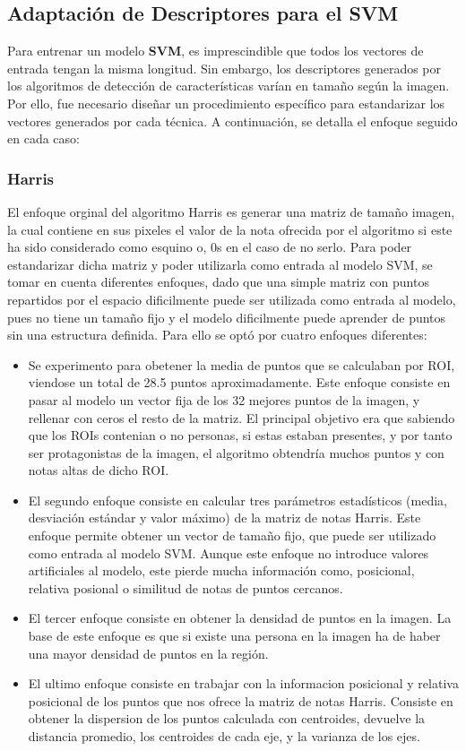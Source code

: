 \documentclass[a4paper]{article}
\begin{document}
\subsection{Adaptación de Descriptores para el SVM}

Para entrenar un modelo \textbf{SVM}, es imprescindible que todos los vectores de entrada tengan la misma longitud. Sin embargo, los descriptores generados por los algoritmos de detección de características varían en tamaño según la imagen. Por ello, fue necesario diseñar un procedimiento específico para estandarizar los vectores generados por cada técnica. A continuación, se detalla el enfoque seguido en cada caso:

\subsubsection*{Harris}

El enfoque orginal del algoritmo Harris es generar una matriz de tamaño imagen, la cual contiene en sus pixeles el valor de la nota ofrecida por el algoritmo si este ha sido considerado como esquino o, 0s en el caso de no serlo. 
Para poder estandarizar dicha matriz y poder utilizarla como entrada al modelo SVM, se tomar en cuenta diferentes enfoques, dado que una simple matriz con puntos repartidos por el espacio dificilmente puede ser utilizada como entrada al modelo, pues no tiene un tamaño fijo y el modelo dificilmente puede aprender de puntos sin una estructura definida.
Para ello se optó por cuatro enfoques diferentes:
\begin{itemize}
    \item Se experimento para obetener la media de puntos que se calculaban por ROI, viendose un total de 28.5 puntos aproximadamente. Este enfoque consiste en pasar al modelo un vector fija de los 32 mejores puntos de la imagen, y rellenar con ceros el resto de la matriz. El principal objetivo era que sabiendo que los ROIs contenian o no personas, si estas estaban presentes, y por tanto ser protagonistas de la imagen, el algoritmo obtendría muchos puntos y con notas altas de dicho ROI.
    \item El segundo enfoque consiste en calcular tres parámetros estadísticos (media, desviación estándar y valor máximo) de la matriz de notas Harris. Este enfoque permite obtener un vector de tamaño fijo, que puede ser utilizado como entrada al modelo SVM. Aunque este enfoque no introduce valores artificiales al modelo, este pierde mucha información como, posicional, relativa posional o similitud de notas de puntos cercanos.
    \item El tercer enfoque consiste en obtener la densidad de puntos en la imagen. La base de este enfoque es que si existe una persona en la imagen ha de haber una mayor densidad de puntos en la región.
    \item El ultimo enfoque consiste en trabajar con la informacion posicional y relativa posicional de los puntos que nos ofrece la matriz de notas Harris. Consiste en obtener la dispersion de los puntos calculada con centroides, devuelve la distancia promedio, los centroides de cada eje, y la varianza de los ejes. 
\end{itemize}
\end{document}
